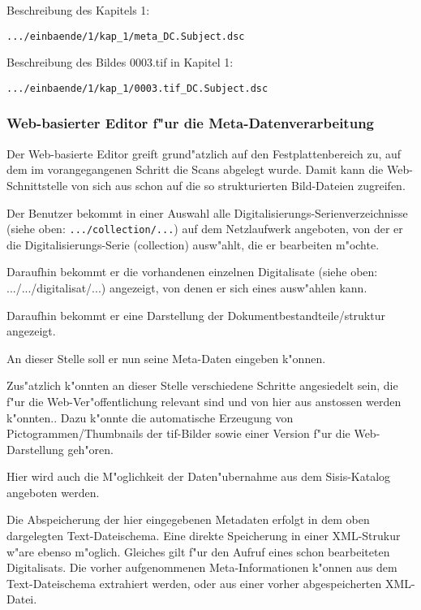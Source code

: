 \documentclass[11pt, twoside, a4paper, BCOR8mm, DIV12, bibtotoc,idxtotoc]{scrreprt}
\begin{document}
Beschreibung des Kapitels 1:
\begin{verbatim}
.../einbaende/1/kap_1/meta_DC.Subject.dsc
\end{verbatim}

Beschreibung des Bildes 0003.tif in Kapitel 1:
\begin{verbatim}
.../einbaende/1/kap_1/0003.tif_DC.Subject.dsc
\end{verbatim}

\subsubsection{Web-basierter Editor f"ur die Meta-Datenverarbeitung}

Der Web-basierte Editor greift grund"atzlich auf den Festplattenbereich zu,
auf dem im voran\-ge\-gan\-ge\-nen Schritt die Scans abgelegt wurde. Damit kann die
Web-Schnittstelle von sich aus schon auf die so strukturierten Bild-Dateien
zugreifen.

Der Benutzer bekommt in einer Auswahl alle
Digitalisierungs-Serienverzeichnisse (siehe oben:
\texttt{.../collection/...}) auf dem Netzlaufwerk angeboten, von der
er die Digitalisierungs-Serie (collection) ausw"ahlt, die er
bearbeiten m"ochte.

Daraufhin bekommt er die vorhandenen einzelnen Digitalisate
(siehe oben: .../.../digitalisat/...) angezeigt, von denen er sich eines
ausw"ahlen kann. 

Daraufhin bekommt er eine Darstellung der Dokumentbestandteile/struktur
angezeigt. 

An dieser Stelle soll er nun seine Meta-Daten eingeben k"onnen.

Zus"atzlich k"onnten an dieser Stelle verschiedene Schritte
angesiedelt sein, die f"ur die Web-Ver"offentlichung relevant sind und
von hier aus anstossen werden k"onnten.. Dazu k"onnte die automatische
Erzeugung von Pictogrammen/Thumbnails der tif-Bilder sowie einer
Version f"ur die Web-Darstellung geh"oren.

Hier wird auch die M"oglichkeit der Daten"uber\-nahme aus dem Sisis-Katalog
angeboten werden.

Die Abspeicherung der hier eingegebenen Metadaten erfolgt in dem oben
dargelegten Text-Dateischema.  Eine direkte Speicherung in einer
XML-Strukur w"are ebenso m"oglich. Gleiches gilt f"ur den Aufruf eines
schon bearbeiteten Digitalisats. Die vorher aufgenommenen Meta-Informationen
k"onnen aus dem Text-Dateischema extrahiert werden, oder aus einer vorher
ab\-ge\-spei\-cher\-ten XML-Datei.
\end{document}

